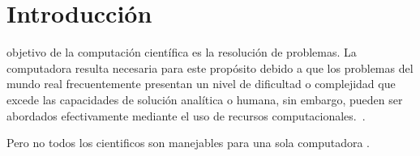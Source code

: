 \section{Introducción}
 objetivo de la computación científica es la resolución 
de problemas. La computadora resulta necesaria para este propósito debido a 
que los problemas del mundo real frecuentemente presentan un nivel de dificultad 
o complejidad que excede las capacidades de solución analítica o humana, sin embargo,
 pueden ser abordados efectivamente mediante el uso 
 de recursos computacionales.~\cite{landau01}.

Pero no todos los cientificos son manejables para una sola computadora \cite{juve-01}.